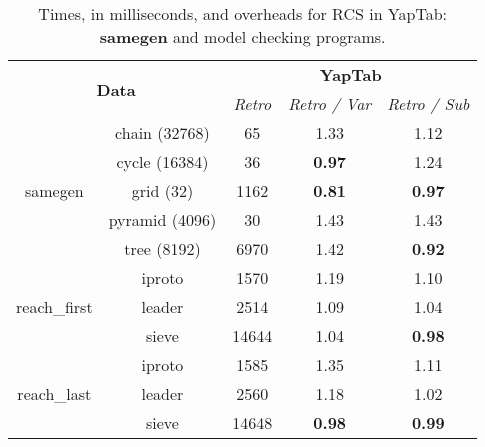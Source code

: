 \begin{table}[ht]
\centering
\small{
  \begin{tabular}{cc|ccc}
   \hline
    \hline
    \multicolumn{2}{c|}{\multirow{2}{*}{\normalsize{\textbf{Data}}}} & \multicolumn{3}{c}{\normalsize{\textbf{YapTab}}} \\
     \multicolumn{2}{c|}{} & \small{\textit{Retro}} & \textit{\small{Retro / Var}} & \textit{\small{Retro / Sub}} \\
   \hline
   \hline

   \multirow{5}{*}{samegen} &  \footnotesize{chain  (32768) } &  65 &  1.33  &  1.12 \\
   &  \footnotesize{cycle  (16384) } &  36 &  \textbf{0.97}  &  1.24 \\
   &  \footnotesize{grid  (32) } &  1162 &  \textbf{0.81}  &  \textbf{0.97} \\
   &  \footnotesize{pyramid  (4096) } &  30 &  1.43  &  1.43 \\
   &  \footnotesize{tree  (8192) } &  6970 &  1.42  &  \textbf{0.92} \\
   \hline
   \multirow{3}{*}{reach\_first} &  iproto  &  1570 &  1.19  &  1.10 \\
   &  leader  &  2514 &  1.09  &  1.04 \\
   &  sieve  &  14644 &  1.04  &  \textbf{0.98} \\
   \hline
   \multirow{3}{*}{reach\_last} &  iproto  &  1585 &  1.35  &  1.11 \\
   &  leader  &  2560 &  1.18  &  1.02 \\
   &  sieve  &  14648 &  \textbf{0.98}  &  \textbf{0.99} \\
   \hline
\hline
\end{tabular}
}
\caption{Times, in milliseconds, and overheads for RCS in YapTab: \textbf{samegen} and model checking programs.}
\label{tbl:overhead_detail_model}
\end{table}